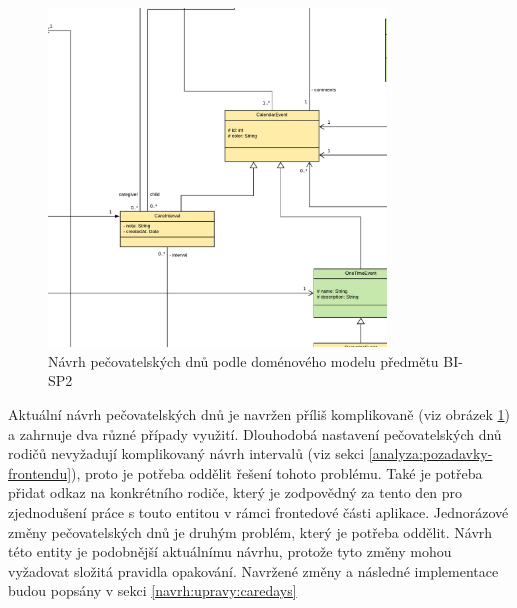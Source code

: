         \begin{figure}\centering
            \includegraphics[width=0.8\textwidth]{pdfs/CareDays1}
            \caption[Současný návrh pečovatelských dnů]{Návrh pečovatelských dnů podle doménového modelu předmětu BI-SP2}\label{image:caredays1}
        \end{figure}
        Aktuální návrh pečovatelských dnů je navržen příliš komplikovaně (viz obrázek \ref{image:caredays1}) a zahrnuje dva různé případy využití. Dlouhodobá nastavení pečovatelských dnů rodičů nevyžadují komplikovaný návrh intervalů (viz sekci \ref{analyza:pozadavky-frontendu}), proto je potřeba oddělit řešení tohoto problému. Také je potřeba přidat odkaz na konkrétního rodiče, který je zodpovědný za tento den pro zjednodušení práce s touto entitou v rámci frontedové části aplikace. Jednorázové změny pečovatelských dnů je druhým problém, který je potřeba oddělit. Návrh této entity je podobnější aktuálnímu návrhu, protože tyto změny mohou vyžadovat složitá pravidla opakování. Navržené změny a následné implementace budou popsány v sekci \ref{navrh:upravy:caredays}
        
